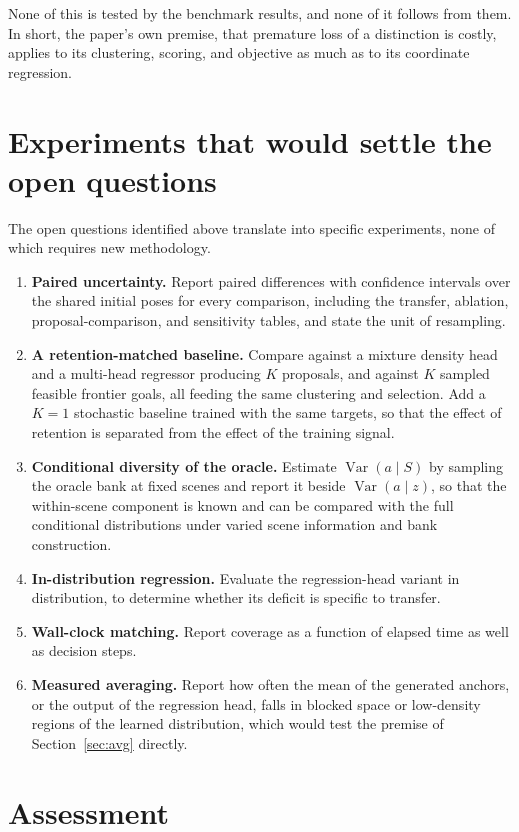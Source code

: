 \documentclass[11pt]{article}
\theoremstyle{plain}
\theoremstyle{remark}
\begin{document}
None of this is tested by the benchmark results, and none of it follows from them. In short, the paper's own premise, that premature loss of a distinction is costly, applies to its clustering, scoring, and objective as much as to its coordinate regression.

\section{Experiments that would settle the open questions}\label{sec:settle}

The open questions identified above translate into specific experiments, none of which requires new methodology.
\begin{enumerate}
\item \textbf{Paired uncertainty.} Report paired differences with confidence intervals over the shared initial poses for every comparison, including the transfer, ablation, proposal-comparison, and sensitivity tables, and state the unit of resampling.
\item \textbf{A retention-matched baseline.} Compare against a mixture density head and a multi-head regressor producing $K$ proposals, and against $K$ sampled feasible frontier goals, all feeding the same clustering and selection. Add a $K=1$ stochastic baseline trained with the same targets, so that the effect of retention is separated from the effect of the training signal.
\item \textbf{Conditional diversity of the oracle.} Estimate $\operatorname{Var}(a\mid S)$ by sampling the oracle bank at fixed scenes and report it beside $\operatorname{Var}(a\mid z)$, so that the within-scene component is known and can be compared with the full conditional distributions under varied scene information and bank construction.
\item \textbf{In-distribution regression.} Evaluate the regression-head variant in distribution, to determine whether its deficit is specific to transfer.
\item \textbf{Wall-clock matching.} Report coverage as a function of elapsed time as well as decision steps.
\item \textbf{Measured averaging.} Report how often the mean of the generated anchors, or the output of the regression head, falls in blocked space or low-density regions of the learned distribution, which would test the premise of Section~\ref{sec:avg} directly.
\end{enumerate}

\section{Assessment}
\end{document}
